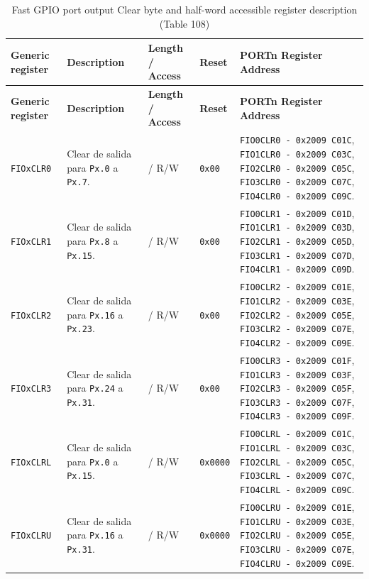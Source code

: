 \begin{longtable}{|>{\raggedright\arraybackslash}p{}|>{\raggedright\arraybackslash}p{}|>{\centering\arraybackslash}p{}|>{\centering\arraybackslash}p{}|>{\raggedright\arraybackslash}p{}|}
\caption{Fast GPIO port output Clear byte and half-word accessible register description (Table 108)} \\
\hline
\textbf{Generic register} & \textbf{Description} & \textbf{Length / Access} & \textbf{Reset} & \textbf{PORTn Register Address} \\
\hline
\endfirsthead
\hline
\textbf{Generic register} & \textbf{Description} & \textbf{Length / Access} & \textbf{Reset} & \textbf{PORTn Register Address} \\
\hline
\endhead
\texttt{FIOxCLR0} & Clear de salida para \texttt{Px.0} a \texttt{Px.7}. & 8 / R/W & \texttt{0x00} & \texttt{FIO0CLR0 - 0x2009 C01C}, \texttt{FIO1CLR0 - 0x2009 C03C}, \texttt{FIO2CLR0 - 0x2009 C05C}, \texttt{FIO3CLR0 - 0x2009 C07C}, \texttt{FIO4CLR0 - 0x2009 C09C}. \\
\hline
\texttt{FIOxCLR1} & Clear de salida para \texttt{Px.8} a \texttt{Px.15}. & 8 / R/W & \texttt{0x00} & \texttt{FIO0CLR1 - 0x2009 C01D}, \texttt{FIO1CLR1 - 0x2009 C03D}, \texttt{FIO2CLR1 - 0x2009 C05D}, \texttt{FIO3CLR1 - 0x2009 C07D}, \texttt{FIO4CLR1 - 0x2009 C09D}. \\
\hline
\texttt{FIOxCLR2} & Clear de salida para \texttt{Px.16} a \texttt{Px.23}. & 8 / R/W & \texttt{0x00} & \texttt{FIO0CLR2 - 0x2009 C01E}, \texttt{FIO1CLR2 - 0x2009 C03E}, \texttt{FIO2CLR2 - 0x2009 C05E}, \texttt{FIO3CLR2 - 0x2009 C07E}, \texttt{FIO4CLR2 - 0x2009 C09E}. \\
\hline
\texttt{FIOxCLR3} & Clear de salida para \texttt{Px.24} a \texttt{Px.31}. & 8 / R/W & \texttt{0x00} & \texttt{FIO0CLR3 - 0x2009 C01F}, \texttt{FIO1CLR3 - 0x2009 C03F}, \texttt{FIO2CLR3 - 0x2009 C05F}, \texttt{FIO3CLR3 - 0x2009 C07F}, \texttt{FIO4CLR3 - 0x2009 C09F}. \\
\hline
\texttt{FIOxCLRL} & Clear de salida para \texttt{Px.0} a \texttt{Px.15}. & 16 / R/W & \texttt{0x0000} & \texttt{FIO0CLRL - 0x2009 C01C}, \texttt{FIO1CLRL - 0x2009 C03C}, \texttt{FIO2CLRL - 0x2009 C05C}, \texttt{FIO3CLRL - 0x2009 C07C}, \texttt{FIO4CLRL - 0x2009 C09C}. \\
\hline
\texttt{FIOxCLRU} & Clear de salida para \texttt{Px.16} a \texttt{Px.31}. & 16 / R/W & \texttt{0x0000} & \texttt{FIO0CLRU - 0x2009 C01E}, \texttt{FIO1CLRU - 0x2009 C03E}, \texttt{FIO2CLRU - 0x2009 C05E}, \texttt{FIO3CLRU - 0x2009 C07E}, \texttt{FIO4CLRU - 0x2009 C09E}. \\
\hline
\end{longtable}


